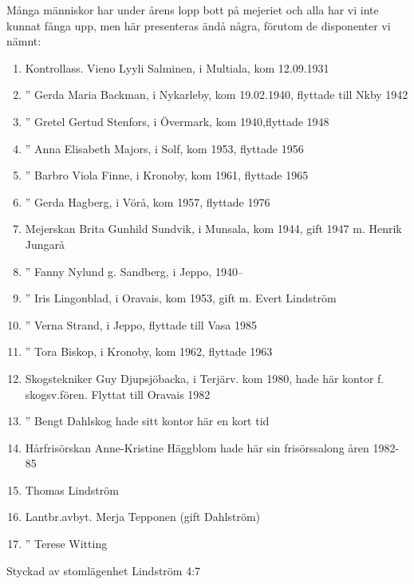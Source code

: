 Många människor har under årens lopp  bott på mejeriet och alla har vi inte kunnat fånga upp, men här presenteras ändå några, förutom de disponenter vi nämnt:
\begin{enumerate}
  \item Kontrollass.  Vieno Lyyli Salminen,  i Multiala, kom 12.09.1931
  \item     ''        Gerda Maria Backman,  i Nykarleby, kom 19.02.1940, flyttade till Nkby 1942
  \item     ''        Gretel Gertud Stenfors,  i Övermark, kom 1940,flyttade 1948
  \item     ''        Anna Elisabeth Majors,  i Solf, kom 1953, flyttade 1956
  \item     ''        Barbro Viola Finne,  i Kronoby, kom 1961, flyttade 1965
  \item     ''        Gerda Hagberg,  i Vörå, kom 1957, flyttade 1976
  \item Mejerskan     Brita Gunhild Sundvik,  i Munsala, kom 1944, gift 1947 m. Henrik Jungarå
  \item     ''        Fanny Nylund g. Sandberg,  i Jeppo, 1940--
  \item     ''        Iris Lingonblad,  i Oravais, kom 1953, gift m. Evert Lindström
  \item     ''        Verna Strand,   i Jeppo, flyttade till Vasa 1985
  \item     ''        Tora Biskop,   i  Kronoby, kom 1962, flyttade 1963
  \item Skogstekniker Guy Djupsjöbacka,  i Terjärv. kom 1980, hade här kontor f. skogsv.fören. Flyttat till Oravais 1982
  \item     ''        Bengt Dahlskog hade sitt kontor här en kort tid
  \item Hårfrisörskan Anne-Kristine Häggblom hade här sin frisörssalong åren 1982-85
  \item Thomas Lindström
  \item Lantbr.avbyt. Merja Tepponen (gift Dahlström)
  \item     ''        Terese Witting
\end{enumerate}




Styckad av stomlägenhet Lindström 4:7

